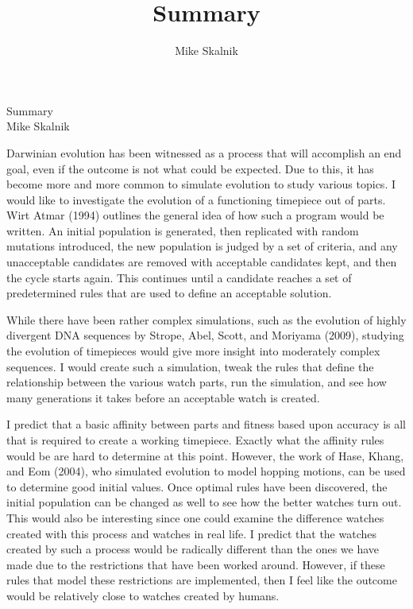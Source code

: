 \documentclass[12pt]{article}
\title{Summary}
\author{Mike Skalnik}
\begin{document}
\begin{flushright}{\large Summary\\ Mike Skalnik}\end{flushright}

Darwinian evolution has been witnessed as a process that will accomplish an end goal, even if the outcome is not what could be expected. Due to this, it has become more and more common to simulate evolution to study various topics. I would like to investigate the evolution of a functioning timepiece out of parts. Wirt Atmar (1994) outlines the general idea of how such a program would be written. An initial population is generated, then replicated with random mutations introduced, the new population is judged by a set of criteria, and any unacceptable candidates are removed with acceptable candidates kept, and then the cycle starts again. This continues until a candidate reaches a set of predetermined rules that are used to define an acceptable solution.

While there have been rather complex simulations, such as the evolution of highly divergent DNA sequences by Strope, Abel, Scott, and Moriyama (2009), studying the evolution of timepieces would give more insight into moderately complex sequences. I would create such a simulation, tweak the rules that define the relationship between the various watch parts, run the simulation, and see how many generations it takes before an acceptable watch is created.

I predict that a basic affinity between parts and fitness based upon accuracy is all that is required to create a working timepiece. Exactly what the affinity rules would be are hard to determine at this point. However, the work of Hase, Khang, and Eom (2004), who simulated evolution to model hopping motions, can be used to determine good initial values. Once optimal rules have been discovered, the initial population can be changed as well to see how the better watches turn out. This would also be interesting since one could examine the difference watches created with this process and watches in real life. I predict that the watches created by such a process would be radically different than the ones we have made due to the restrictions that have been worked around. However, if these rules that model these restrictions are implemented, then I feel like the outcome would be relatively close to watches created by humans.
\end{document}

